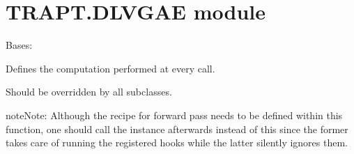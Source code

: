 \documentclass[letterpaper,10pt,english]{sphinxmanual}
\begin{document}
\chapter{TRAPT.DLVGAE module}
\label{\detokenize{index:module-TRAPT.DLVGAE}}\label{\detokenize{index:trapt-dlvgae-module}}

\begin{fulllineitems}
\label{\detokenize{index:TRAPT.DLVGAE.CVAE}}
\pysigstartsignatures
{}
\pysigstopsignatures
\sphinxAtStartPar
Bases: 

\begin{fulllineitems}
\label{\detokenize{index:TRAPT.DLVGAE.CVAE.forward}}
\pysigstartsignatures
{}
\pysigstopsignatures
\sphinxAtStartPar
Defines the computation performed at every call.

\sphinxAtStartPar
Should be overridden by all subclasses.

\begin{sphinxadmonition}{note}{Note:}
\sphinxAtStartPar
Although the recipe for forward pass needs to be defined within
this function, one should call the  instance afterwards
instead of this since the former takes care of running the
registered hooks while the latter silently ignores them.
\end{sphinxadmonition}

\end{fulllineitems}


\begin{fulllineitems}
\label{\detokenize{index:TRAPT.DLVGAE.CVAE.kl_div}}
\pysigstartsignatures
{}
\pysigstopsignatures
\end{fulllineitems}


\end{fulllineitems}
\end{document}
